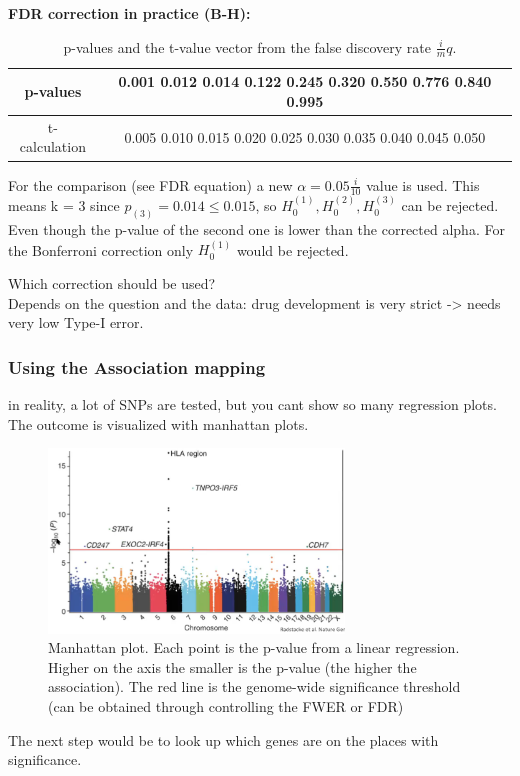 \documentclass{article}
\begin{document}
\noindent
\textbf{FDR correction in practice (B-H):}\\
\begin{table}[H]
\centering
\caption{p-values and the t-value vector from the false discovery rate $\frac{i}{m}q$.}
\begin{tabular}{c|c}
p-values & 0.001 0.012 0.014 0.122 0.245 0.320 0.550 0.776 0.840 0.995\\
\hline
t-calculation & 0.005 0.010 0.015 0.020 0.025 0.030 0.035 0.040 0.045 0.050\\
\end{tabular}
\end{table}
For the comparison (see FDR equation) a new $\alpha = 0.05 \frac{i}{10}$ value is used. This means k = 3 since $p_{(3)} = 0.014 \leq 0.015$, so $H_0^{(1)} , H_0^{(2)},  H_0^{(3)}$ can be rejected. Even though the p-value of the second one is lower than the corrected alpha. For the Bonferroni correction only $H_0^{(1)}$ would be rejected.

Which correction should be used?\\
Depends on the question and the data: drug development is very strict -> needs very low Type-I error. 

\subsubsection{Using the Association mapping}
in reality, a lot of SNPs are tested, but you cant show so many regression plots. The outcome is visualized with manhattan plots.
\begin{figure}[H]
\centering
\includegraphics[width = 0.7\textwidth]{gwa/manhattan.png}
\caption{Manhattan plot. Each point is the p-value from a linear regression. Higher on the axis the smaller is the p-value (the higher the association). The red line is the genome-wide significance threshold (can be obtained through controlling the FWER or FDR)}
\end{figure}
The next step would be to look up which genes are on the places with significance.
\end{document}
